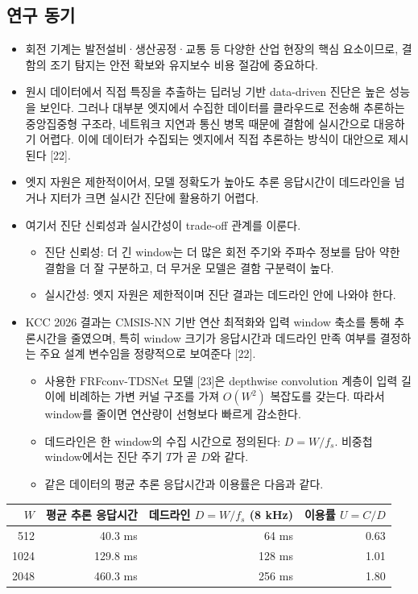\documentclass[10pt]{article}
\begin{document}
\subsection{연구 동기}
\begin{itemize}
\item 회전 기계는 발전설비·생산공정·교통 등 다양한 산업 현장의 핵심 요소이므로, 결함의 조기 탐지는 안전 확보와 유지보수 비용 절감에 중요하다.
\item 원시 데이터에서 직접 특징을 추출하는 딥러닝 기반 data-driven 진단은 높은 성능을 보인다. 그러나 대부분 엣지에서 수집한 데이터를 클라우드로 전송해 추론하는 중앙집중형 구조라, 네트워크 지연과 통신 병목 때문에 결함에 실시간으로 대응하기 어렵다. 이에 데이터가 수집되는 엣지에서 직접 추론하는 방식이 대안으로 제시된다 [22].
\item 엣지 자원은 제한적이어서, 모델 정확도가 높아도 추론 응답시간이 데드라인을 넘거나 지터가 크면 실시간 진단에 활용하기 어렵다.
\item 여기서 진단 신뢰성과 실시간성이 trade-off 관계를 이룬다.
\begin{itemize}
\item 진단 신뢰성: 더 긴 window는 더 많은 회전 주기와 주파수 정보를 담아 약한 결함을 더 잘 구분하고, 더 무거운 모델은 결함 구분력이 높다.
\item 실시간성: 엣지 자원은 제한적이며 진단 결과는 데드라인 안에 나와야 한다.
\end{itemize}
\item KCC 2026 결과는 CMSIS-NN 기반 연산 최적화와 입력 window 축소를 통해 추론시간을 줄였으며, 특히 window 크기가 응답시간과 데드라인 만족 여부를 결정하는 주요 설계 변수임을 정량적으로 보여준다 [22].
\begin{itemize}
\item 사용한 FRFconv-TDSNet 모델 [23]은 depthwise convolution 계층이 입력 길이에 비례하는 가변 커널 구조를 가져 $O(W^2)$ 복잡도를 갖는다. 따라서 window를 줄이면 연산량이 선형보다 빠르게 감소한다.
\item 데드라인은 한 window의 수집 시간으로 정의된다: $D = W / f_s$. 비중첩 window에서는 진단 주기 $T$가 곧 $D$와 같다.
\item 같은 데이터의 평균 추론 응답시간과 이용률은 다음과 같다.
\end{itemize}
\end{itemize}
\begin{center}\footnotesize
\begin{tabular}{@{}rrrr@{}}
\toprule
$W$ & 평균 추론 응답시간 & 데드라인 $D = W/f_s$ (8 kHz) & 이용률 $U = C/D$ \\ \midrule
512 & 40.3 ms & 64 ms & 0.63 \\
1024 & 129.8 ms & 128 ms & 1.01 \\
2048 & 460.3 ms & 256 ms & 1.80 \\
\bottomrule
\end{tabular}
\end{center}
\end{document}
